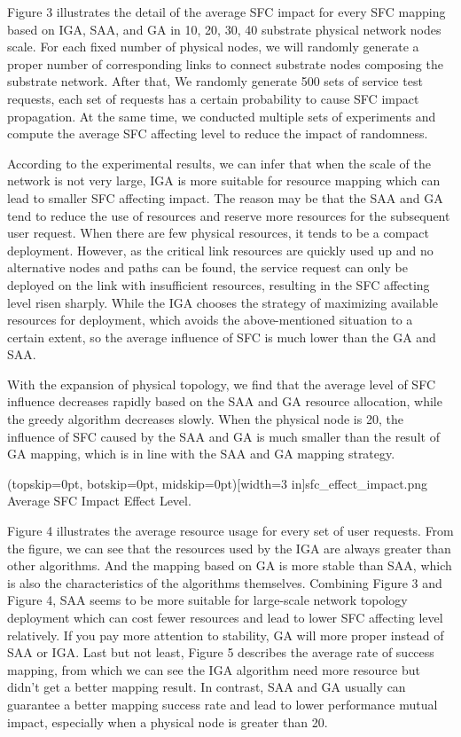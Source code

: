 \documentclass{ieeeaccess}
\begin{document}
Figure 3 illustrates the detail of the average SFC impact for every SFC mapping based on IGA, SAA, and GA in 10, 20, 30, 40 substrate physical network nodes scale. For each fixed number of physical nodes, we will randomly generate a proper number of corresponding links to connect substrate nodes composing the substrate network. After that, We randomly generate 500 sets of service test requests, each set of requests has a certain probability to cause SFC impact propagation. At the same time, we conducted multiple sets of experiments and compute the average SFC affecting level to reduce the impact of randomness.

According to the experimental results, we can infer that when the scale of the network is not very large, IGA is more suitable for resource mapping which can lead to smaller SFC affecting impact. The reason may be that the SAA and GA tend to reduce the use of resources and reserve more resources for the subsequent user request. When there are few physical resources, it tends to be a compact deployment. However, as the critical link resources are quickly used up and no alternative nodes and paths can be found, the service request can only be deployed on the link with insufficient resources, resulting in the SFC affecting level risen sharply. While the IGA chooses the strategy of maximizing available resources for deployment, which avoids the above-mentioned situation to a certain extent, so the average influence of SFC is much lower than the GA and SAA.

With the expansion of physical topology, we find that the average level of SFC influence decreases rapidly based on the SAA and GA resource allocation, while the greedy algorithm decreases slowly. When the physical node is 20, the influence of SFC caused by the SAA and GA  is much smaller than the result of GA mapping, which is in line with the SAA and GA mapping strategy.

\Figure[t!](topskip=0pt, botskip=0pt, midskip=0pt)[width=3 in]{sfc_effect_impact.png}
{ Average SFC Impact Effect Level.\label{fig3}}

Figure 4 illustrates the average resource usage for every set of user requests. From the figure, we can see that the resources used by the IGA are always greater than other algorithms. And the mapping based on GA is more stable than SAA, which is also the characteristics of the algorithms themselves. Combining Figure 3 and Figure 4, SAA seems to be more suitable for large-scale network topology deployment which can cost fewer resources and lead to lower SFC affecting level relatively. If you pay more attention to stability, GA will more proper instead of SAA or IGA. Last but not least, Figure 5 describes the average rate of success mapping, from which we can see the IGA algorithm need more resource but didn't get a better mapping result. In contrast, SAA and GA usually can guarantee a better mapping success rate and lead to lower performance mutual impact, especially when a physical node is greater than 20.
\end{document}
